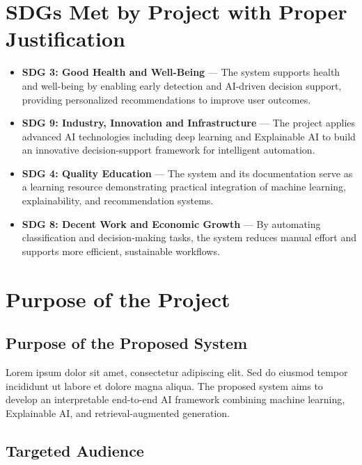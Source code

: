 \documentclass[12pt,a4paper]{report}
\begin{document}
\chapter{SDGs Met by Project with Proper Justification}

\begin{itemize}
    \item \textbf{SDG 3: Good Health and Well-Being} ---
    The system supports health and well-being by enabling early detection and AI-driven decision support, providing personalized recommendations to improve user outcomes.

    \item \textbf{SDG 9: Industry, Innovation and Infrastructure} ---
    The project applies advanced AI technologies including deep learning and Explainable AI to build an innovative decision-support framework for intelligent automation.

    \item \textbf{SDG 4: Quality Education} ---
    The system and its documentation serve as a learning resource demonstrating practical integration of machine learning, explainability, and recommendation systems.

    \item \textbf{SDG 8: Decent Work and Economic Growth} ---
    By automating classification and decision-making tasks, the system reduces manual effort and supports more efficient, sustainable workflows.
\end{itemize}

\chapter{Purpose of the Project}

\section{Purpose of the Proposed System}

Lorem ipsum dolor sit amet, consectetur adipiscing elit. Sed do eiusmod tempor incididunt ut labore et dolore magna aliqua. The proposed system aims to develop an interpretable end-to-end AI framework combining machine learning, Explainable AI, and retrieval-augmented generation.

\section{Targeted Audience}
\end{document}
